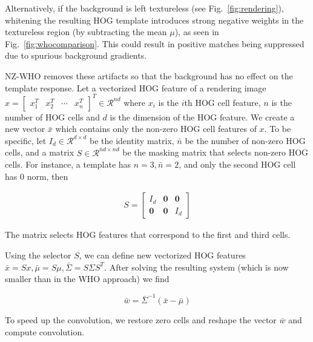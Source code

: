 Alternatively, if the background is left textureless (see
Fig.~\ref{fig:rendering}), whitening the resulting HOG template introduces
strong negative weights in the textureless region (by subtracting the mean
$\mu$), as seen in Fig.~\ref{fig:whocomparison}.
This could result in positive matches being suppressed due to spurious
background gradients.

NZ-WHO removes these artifacts so that the background has no effect on the
template response. Let a vectorized HOG feature of a rendering image $x = [
\begin{array}{ccccc}x_1^T & x_2^T & \cdots & x_n^T\end{array} ]^T \in
\mathcal{R}^{nd}$ where $x_i$ is the $i$th HOG cell feature, $n$ is the
number of HOG cells and $d$ is the dimension of the HOG feature. We create a new
vector $\bar{x}$ which contains only the non-zero HOG cell features of $x$. To be
specific, let $I_d\in \mathcal{R}^{d\times d}$ be the identity matrix, $\bar{n}$ be
the number of non-zero HOG cells, and a matrix $S\in \mathcal{R}^{\bar{n}d \times
nd}$ be the masking matrix that selects non-zero HOG cells. For instance, a
template has  $n=3, \bar{n}=2$, and only the second HOG cell has $0$ norm, then

\begin{align}
    S = \left[ \begin{array}{ccc}
        I_d & \mathbf{0} & \mathbf{0}\\
        \mathbf{0} & \mathbf{0} & I_d
        \end{array} \right]
\end{align}

The matrix selects HOG features that correspond to the first and third cells.

Using the selector $S$, we can define new vectorized HOG features $\bar{x} = S x,
\bar{\mu} = S\mu, \bar{\Sigma} = S \Sigma S^T$. After solving the resulting system (which
is now smaller than in the WHO approach) we find

\begin{equation}
    \bar{w}=\bar{\Sigma}^{-1}(\bar{x} - \bar{\mu}) \label{eq:nz-who}
\end{equation}

To speed up the convolution, we restore zero cells and reshape the vector $\bar{w}$
and compute convolution.


